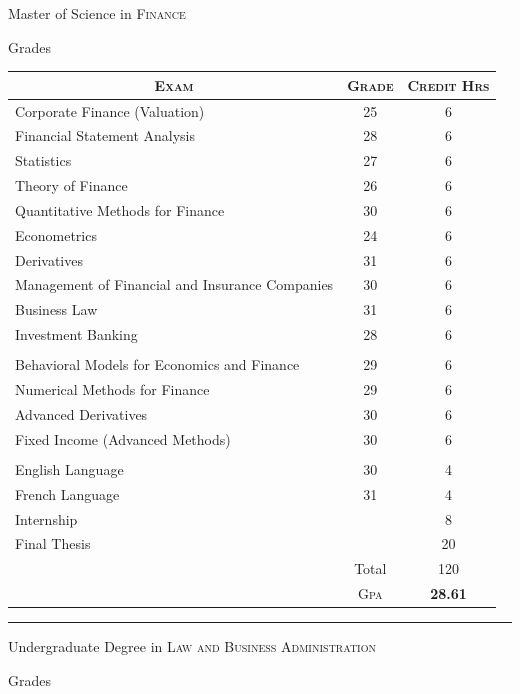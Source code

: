\documentclass[a4paper,10pt]{article}
\begin{document}
\newpage
\par{\centering\Large \hypertarget{grds}{Master of Science in \textsc{Finance}}\par}\large{\centering Grades\par}\normalsize
\begin{center}
\begin{tabular}{lcc}
\multicolumn{1}{c}{\textsc{Exam}}&\textsc{Grade}&\textsc{Credit Hrs}\\ \hline
Corporate Finance (Valuation)	&25&	6\\
Financial Statement Analysis	&28&	6\\
Statistics	&27&	6\\
Theory of Finance	&26&	6\\
Quantitative Methods for Finance	&30&	6\\
Econometrics	&24	&6\\
Derivatives	&31&	6\\
Management of Financial and Insurance Companies	&30&	6\\
Business Law	&31&	6\\
Investment Banking	&28&	6\\ \\
		
Behavioral Models for Economics and Finance	&29&	6\\
Numerical Methods for Finance	&29&	6\\
Advanced Derivatives	&30&	6\\
Fixed Income (Advanced Methods)	&30&	6\\ \\
		
English Language	&30&	4\\
French Language	&31&	4\\
		
Internship	&	&8\\
		
Final Thesis	&	&20\\
		
		& Total&120\\\cline{2-3}
&\textsc{Gpa}&\textbf{28.61}
\end{tabular}
\end{center}
\bigskip
\hrule
\bigskip
\par{\centering\Large \hypertarget{grds_cleli}{Undergraduate Degree in \textsc{Law and Business Administration}}\par}\large{\centering Grades\par}\normalsize
\end{document}
